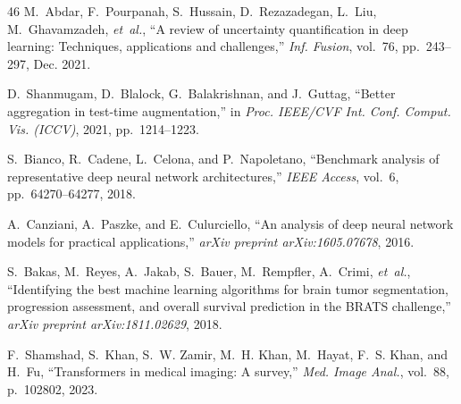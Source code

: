 \begin{thebibliography}{46}
M.~Abdar, F.~Pourpanah, S.~Hussain, D.~Rezazadegan, L.~Liu, M.~Ghavamzadeh, \emph{et~al.}, ``A review of uncertainty quantification in deep learning: Techniques, applications and challenges,'' \emph{Inf. Fusion}, vol.~76, pp.~243--297, Dec. 2021. 

D.~Shanmugam, D.~Blalock, G.~Balakrishnan, and J.~Guttag, ``Better aggregation in test-time augmentation,'' in \emph{Proc. IEEE/CVF Int. Conf. Comput. Vis. (ICCV)}, 2021, pp.~1214--1223.

S.~Bianco, R.~Cadene, L.~Celona, and P.~Napoletano, ``Benchmark analysis of representative deep neural network architectures,'' \emph{IEEE Access}, vol.~6, pp.~64270--64277, 2018. 

A.~Canziani, A.~Paszke, and E.~Culurciello, ``An analysis of deep neural network models for practical applications,'' \emph{arXiv preprint arXiv:1605.07678}, 2016.

S.~Bakas, M.~Reyes, A.~Jakab, S.~Bauer, M.~Rempfler, A.~Crimi, \emph{et~al.}, ``Identifying the best machine learning algorithms for brain tumor segmentation, progression assessment, and overall survival prediction in the BRATS challenge,'' \emph{arXiv preprint arXiv:1811.02629}, 2018.

F.~Shamshad, S.~Khan, S.~W. Zamir, M.~H. Khan, M.~Hayat, F.~S. Khan, and H.~Fu, ``Transformers in medical imaging: A survey,'' \emph{Med. Image Anal.}, vol.~88, p.~102802, 2023. 

\end{thebibliography}
